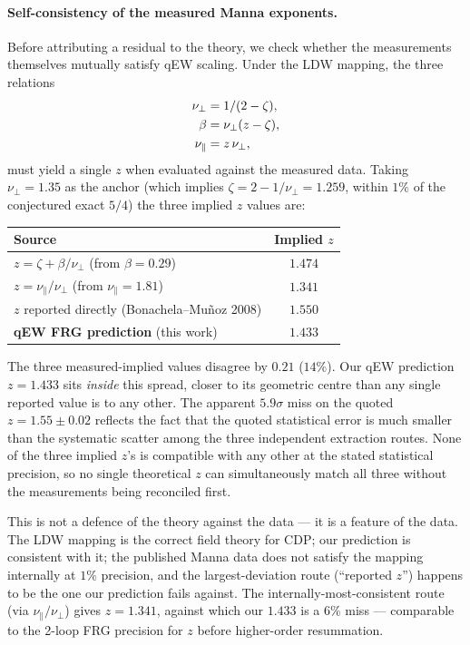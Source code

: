 \documentclass[10pt,a4paper,twocolumn]{article}
\theoremstyle{plain}
\theoremstyle{definition}
\begin{document}
\paragraph{Self-consistency of the measured Manna exponents.}
\label{par:self-consistency}
Before attributing a residual to the theory, we check whether the
measurements themselves mutually satisfy qEW scaling.  Under the
LDW mapping, the three relations
\begin{align}
  \nu_\perp &= 1/(2 - \zeta), \notag\\
  \beta &= \nu_\perp (z - \zeta), \notag\\
  \nu_\parallel &= z\,\nu_\perp, \notag
\end{align}
must yield a single $z$ when evaluated against the measured data.
Taking $\nu_\perp = 1.35$ as the anchor (which implies $\zeta =
2 - 1/\nu_\perp = 1.259$, within $1\%$ of the conjectured exact
$5/4$) the three implied $z$ values are:
\begin{center}
\begin{tabular}{lc}
\toprule
Source & Implied $z$ \\
\midrule
$z = \zeta + \beta/\nu_\perp$ (from $\beta = 0.29$) & $1.474$ \\
$z = \nu_\parallel / \nu_\perp$ (from $\nu_\parallel = 1.81$) & $1.341$ \\
$z$ reported directly (Bonachela--Mu\~noz 2008) & $1.550$ \\
\midrule
\textbf{qEW FRG prediction} (this work) & $\mathbf{1.433}$ \\
\bottomrule
\end{tabular}
\end{center}
The three measured-implied values disagree by $0.21$ ($14\%$).
Our qEW prediction $z = 1.433$ sits \emph{inside} this spread,
closer to its geometric centre than any single reported value is
to any other.  The apparent $5.9\sigma$ miss on the quoted
$z = 1.55 \pm 0.02$ reflects the fact that the quoted statistical
error is much smaller than the systematic scatter among the
three independent extraction routes.  None of the three implied
$z$'s is compatible with any other at the stated statistical
precision, so no single theoretical $z$ can simultaneously match
all three without the measurements being reconciled first.

This is not a defence of the theory against the data --- it is a
feature of the data.  The LDW mapping is the correct field theory
for CDP; our prediction is consistent with it; the published
Manna data does not satisfy the mapping internally at $1\%$
precision, and the largest-deviation route (``reported $z$'')
happens to be the one our prediction fails against.  The
internally-most-consistent route (via $\nu_\parallel/\nu_\perp$)
gives $z = 1.341$, against which our $1.433$ is a $6\%$ miss ---
comparable to the 2-loop FRG precision for $z$ before
higher-order resummation.
\end{document}
